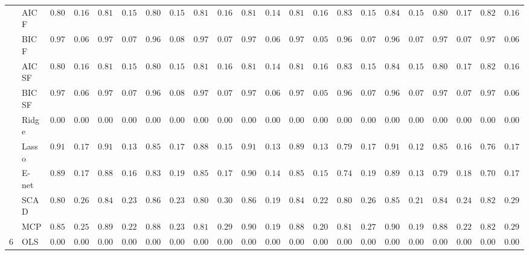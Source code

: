 \begin{tabular}{p{0.2cm}p{1cm}|p{0.6cm}p{0.6cm}|p{0.6cm}p{0.6cm}p{0.6cm}p{0.6cm}p{0.6cm}p{0.6cm}|p{0.6cm}p{0.6cm}p{0.6cm}p{0.6cm}p{0.6cm}p{0.6cm}|p{0.6cm}p{0.6cm}p{0.6cm}p{0.6cm}p{0.6cm}p{0.6cm}}
 & AIC F  & $0.8050$ & $0.1659$ & $0.8150$ & $0.1587$ & $0.8067$ & $0.1584$ & $0.8133$ & $0.1680$ & $0.8100$ & $0.1499$ & $0.8167$ & $0.1615$ & $0.8300$ & $0.1553$ & $0.8400$ & $0.1552$ & $0.8083$ & $0.1714$ & $0.8217$ & $0.1663$ \\
 & BIC F  & $0.9717$ & $0.0672$ & $0.9717$ & $0.0713$ & $0.9650$ & $0.0864$ & $0.9717$ & $0.0713$ & $0.9700$ & $0.0686$ & $0.9783$ & $0.0563$ & $0.9650$ & $0.0796$ & $0.9683$ & $0.0738$ & $0.9700$ & $0.0726$ & $0.9750$ & $0.0643$ \\
 & AIC SF  & $0.8050$ & $0.1659$ & $0.8150$ & $0.1587$ & $0.8067$ & $0.1584$ & $0.8133$ & $0.1680$ & $0.8100$ & $0.1499$ & $0.8167$ & $0.1615$ & $0.8317$ & $0.1526$ & $0.8400$ & $0.1552$ & $0.8083$ & $0.1714$ & $0.8233$ & $0.1638$ \\
 & BIC SF  & $0.9717$ & $0.0672$ & $0.9717$ & $0.0713$ & $0.9650$ & $0.0864$ & $0.9717$ & $0.0713$ & $0.9700$ & $0.0686$ & $0.9783$ & $0.0563$ & $0.9667$ & $0.0786$ & $0.9683$ & $0.0738$ & $0.9700$ & $0.0726$ & $0.9750$ & $0.0643$ \\
 & Ridge  & $0.0000$ & $0.0000$ & $0.0000$ & $0.0000$ & $0.0000$ & $0.0000$ & $0.0000$ & $0.0000$ & $0.0000$ & $0.0000$ & $0.0000$ & $0.0000$ & $0.0000$ & $0.0000$ & $0.0000$ & $0.0000$ & $0.0000$ & $0.0000$ & $0.0000$ & $0.0000$ \\
 & Lasso  & $0.9167$ & $0.1733$ & $0.9133$ & $0.1371$ & $0.8583$ & $0.1747$ & $0.8817$ & $0.1541$ & $0.9183$ & $0.1329$ & $0.8917$ & $0.1369$ & $0.7917$ & $0.1794$ & $0.9183$ & $0.1265$ & $0.8567$ & $0.1642$ & $0.7633$ & $0.1791$ \\
 & E-net  & $0.8983$ & $0.1739$ & $0.8867$ & $0.1656$ & $0.8317$ & $0.1932$ & $0.8533$ & $0.1745$ & $0.9017$ & $0.1423$ & $0.8533$ & $0.1558$ & $0.7417$ & $0.1901$ & $0.8983$ & $0.1399$ & $0.7950$ & $0.1817$ & $0.7083$ & $0.1794$ \\
 & SCAD  & $0.8017$ & $0.2624$ & $0.8467$ & $0.2389$ & $0.8617$ & $0.2346$ & $0.8067$ & $0.3095$ & $0.8650$ & $0.1963$ & $0.8400$ & $0.2209$ & $0.8000$ & $0.2670$ & $0.8567$ & $0.2171$ & $0.8433$ & $0.2425$ & $0.8250$ & $0.2943$ \\
 & MCP  & $0.8567$ & $0.2518$ & $0.8917$ & $0.2289$ & $0.8817$ & $0.2349$ & $0.8183$ & $0.2969$ & $0.9083$ & $0.1944$ & $0.8833$ & $0.2017$ & $0.8100$ & $0.2773$ & $0.9067$ & $0.1929$ & $0.8850$ & $0.2281$ & $0.8233$ & $0.2957$ \\\hline
6 & OLS  & $0.0000$ & $0.0000$ & $0.0000$ & $0.0000$ & $0.0000$ & $0.0000$ & $0.0000$ & $0.0000$ & $0.0000$ & $0.0000$ & $0.0000$ & $0.0000$ & $0.0000$ & $0.0000$ & $0.0000$ & $0.0000$ & $0.0000$ & $0.0000$ & $0.0000$ & $0.0000$ \\

\end{tabular}
